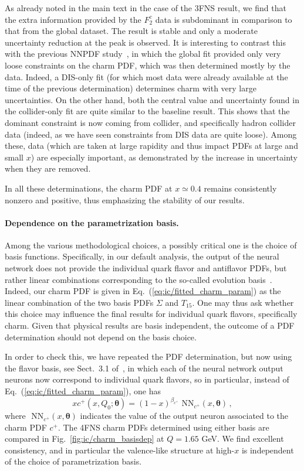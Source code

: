 As already noted in the main  text in the case of the 3FNS
result, we find that the extra information provided by the  \emc
$F_2^c$ data is subdominant in comparison to that from the global
dataset. The result is stable and only a moderate
uncertainty reduction at the peak is observed. It is interesting to
contrast this with the previous NNPDF study~\cite{Ball:2016neh}, in
which the global fit provided only very loose constraints on the charm
PDF, which was then determined mostly by the \emc data.
%
Indeed, a DIS-only fit (for which most data were already available at the time
of the previous determination) determines charm with very large
uncertainties. On the other hand, both the central value and
uncertainty found in the collider-only fit are quite similar to the
baseline result.
%
This shows that the dominant constraint is now coming from
collider, and specifically hadron collider data (indeed, as we have
seen constraints from DIS data are quite loose). Among these, \lhcb
data (which are taken at large rapidity and thus impact PDFs at large
and small $x$) are especially important, as demonstrated by the
increase in uncertainty when they are removed.

In all these determinations, the charm
PDF at $x\simeq 0.4$ remains consistently nonzero and positive, thus
emphasizing the stability of our results.

\paragraph{Dependence on the parametrization basis.}
%
Among the various methodological choices, a possibly critical one is
the choice of basis functions. Specifically, in our default analysis,
the output of the neural network does not provide the individual
quark flavor and antiflavor PDFs, but rather linear combinations
corresponding to the so-called evolution
basis~\cite{Ball:2021leu}. Indeed, our charm PDF is given in
Eq.~(\ref{eq:ic/fitted_charm_param})  as the linear combination of the
two basis PDFs $\Sigma$ and $T_{15}$.
One may thus ask whether this choice may influence the final results
for individual quark flavors, specifically charm.
Given that physical results are basis
independent, the outcome of a PDF determination should not depend
on the basis choice.

In order to check this, we have repeated the PDF determination, but
now using the flavor basis, see Sect.~3.1 of~\cite{Ball:2021leu}, in which
each of the  neural network output neurons now correspond to individual quark
flavors, so in particular,
instead of Eq.~(\ref{eq:ic/fitted_charm_param}),  one has
\begin{equation}
\label{eq:ic/fitted_charm_param_flavour}
xc^+(x,Q_0;{\boldsymbol \theta}) =
 (1-x)^{\beta_{c^+}} \textrm{ NN}_{c^+}(x,{\boldsymbol \theta}) \, ,
\end{equation}
where $\textrm{ NN}_{c^+}(x,{\boldsymbol \theta})$
indicates the value of the output neuron associated to the charm PDF $c^+$.
%
The 4FNS charm PDFs determined using either basis are compared 
in Fig.~\ref{fig:ic/charm_basisdep}  at $Q=1.65$ GeV.
%
We find excellent consistency, and in particular 
the valence-like structure at high-$x$ is independent of the choice
of parametrization basis.

